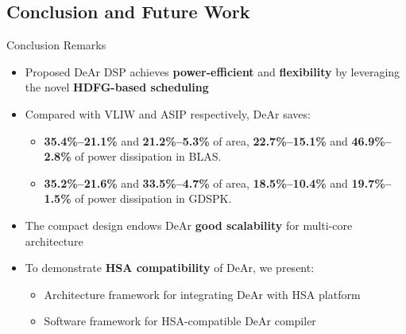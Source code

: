 \documentclass[handout]{beamer}
\begin{document}
\begin{CJK}{UTF8}{bkai}
            \section{Conclusion and Future Work}
            \begin{frame}{Conclusion Remarks}
                \begin{itemize}
                    \item <2->{Proposed DeAr DSP achieves \textbf{power-efficient} and \textbf{flexibility} by leveraging the novel \textbf{HDFG-based scheduling}}
                    \item <3->{Compared with VLIW and ASIP respectively, DeAr saves:
                            \begin{itemize}
                                \item \textbf{35.4\%--21.1\%} and \textbf{21.2\%--5.3\%} of area, \textbf{22.7\%--15.1\%} and \textbf{46.9\%--2.8\%} of power dissipation in BLAS.
                                \item \textbf{35.2\%--21.6\%} and \textbf{33.5\%--4.7\%} of area, \textbf{18.5\%--10.4\%} and \textbf{19.7\%--1.5\%} of power dissipation in GDSPK.
                            \end{itemize}
                        }
                    \item <4->{The compact design endows DeAr \textbf{good scalability} for multi-core architecture}
                    \item <5->{To demonstrate \textbf{HSA compatibility} of DeAr, we present:
                            \begin{itemize}
                                \item Architecture framework for integrating DeAr with HSA platform
                                \item Software framework for HSA-compatible DeAr compiler
                            \end{itemize}
                        }
                \end{itemize}
            \end{frame}


\end{CJK}
\end{document}
